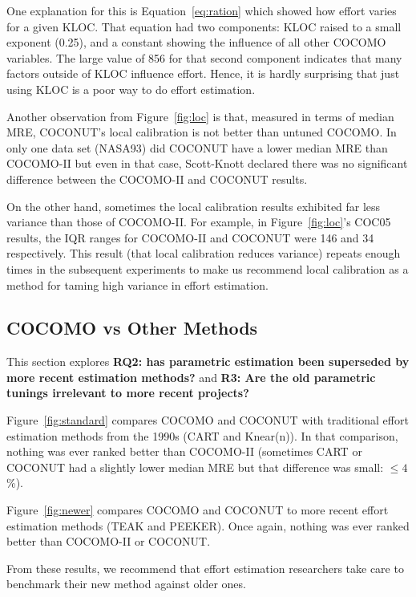 \documentclass{sig-alternate}
\newcommand{\fig}[1]{Figure~\ref{fig:#1}}
\newcommand{\eq}[1]{Equation~\ref{eq:#1}}
\begin{document}
One explanation for this   is \eq{ration} which showed
how    effort   varies for a given KLOC. That equation had two components: KLOC raised to
a small exponent (0.25), and a constant showing the influence of all  other
COCOMO variables. The large value of 856 for that second component
indicates that many factors outside of KLOC influence effort. Hence, it is hardly
surprising that just using KLOC is a poor way to do effort estimation.

Another observation from \fig{loc} is that,
measured in terms of median MRE, COCONUT's local
calibration is not  better
than  untuned COCOMO. In only one data set
(NASA93) did COCONUT have a lower median MRE than
COCOMO-II but even in that case, Scott-Knott
declared there was no significant difference between
the COCOMO-II and COCONUT results.

On the other hand, sometimes the local calibration
results exhibited far less variance than those of
COCOMO-II. For example, in \fig{loc}'s COC05
results, the IQR ranges for
COCOMO-II and COCONUT were 146 and 34 respectively.
This result (that local calibration reduces
variance) repeats enough times in the subsequent
experiments to make us recommend local calibration
as a method for taming high variance in effort
estimation.




\subsection{COCOMO vs Other Methods}\label{sect:othermethods}
This section explores {\bf RQ2: 
has parametric estimation been superseded
by more recent estimation methods?}
and {\bf R3: Are the old parametric tunings irrelevant to
more recent projects?}

\fig{standard} compares COCOMO and COCONUT with  
traditional effort estimation methods
from the 1990s (CART and Knear(n)).
In that comparison, nothing was ever ranked better than COCOMO-II
(sometimes
CART or COCONUT had a slightly lower median MRE but that difference was small: $\le 4$\%).




\fig{newer} compares COCOMO and COCONUT to more recent effort estimation methods
  (TEAK and PEEKER). Once again,   nothing was ever ranked better than COCOMO-II
  or COCONUT.



From these results,
we recommend that effort estimation researchers take care to benchmark
their new method against older ones.
\end{document}
